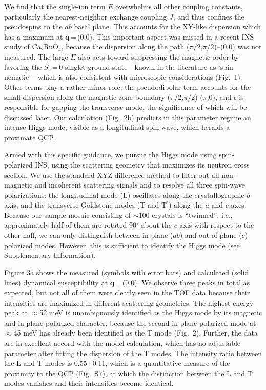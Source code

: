\documentclass[twocolumn,prb,aps,showpacs]{revtex4-1}
\newcommand{\CROns}{Ca$_2$RuO$_4$}
\begin{document}
We find that the single-ion term $E$ %
overwhelms all other coupling constants, particularly the nearest-neighbor exchange coupling $J$, and thus confines the pseudospins to the $ab$ basal plane. This accounts for the XY-like dispersion which has a maximum at $\mathbf{q}$\,=\,(0,0). This important aspect was missed in a recent INS study of \CROns, because the dispersion along the path ($\pi$/2,$\pi$/2)--(0,0) was not measured\cite{Braden_2015}. The large $E$ also acts toward suppressing the magnetic order by favoring the $S_z$\,=\,0 singlet ground state---known in the literature as `spin nematic'\cite{Podolsky2005}---which is also consistent with microscopic considerations (Fig.~1). Other terms play a rather minor role; the pseudodipolar term accounts for the small dispersion along the magnetic zone boundary ($\pi$/2,$\pi$/2)-($\pi$,0), and $\epsilon$ is responsible for gapping the transverse mode, the significance of which will be discussed later.  Our calculation (Fig.~2b) predicts in this parameter regime an intense Higgs mode, visible as a longitudinal spin wave, which heralds a proximate QCP. 

Armed with this specific guidance, we pursue the Higgs mode using spin-polarized INS, using the scattering geometry that maximizes its neutron cross section. We use the standard XYZ-difference method to filter out all non-magnetic and incoherent scattering signals and to resolve all three spin-wave polarizations: the longitudinal mode (L) oscillates along the crystallographic $b$-axis, and the transverse Goldstone modes (T and T$^\prime$) along the $a$ and $c$ axes. Because our sample mosaic consisting of $\sim$100 crystals is ``twinned'', i.e., approximately half of them are rotated 90$^\circ$ about the $c$ axis with respect to the other half, we can only distinguish between in-plane ($ab$) and out-of-plane ($c$) polarized modes. However, this is sufficient to identify the Higgs mode (see Supplementary Information). 


Figure 3a shows the measured (symbols with error bars) and calculated (solid lines) dynamical susceptibility at $\mathbf{q}$\,=\,(0,0). We observe three peaks in total as expected, but not all of them were clearly seen in the TOF data because their intensities are maximized in different scattering geometries. The highest-energy peak at $\approx$52 meV is unambiguously identified as the Higgs mode by its magnetic and in-plane-polarized character, because the second in-plane-polarized mode at $\approx$45 meV has already been identified as the T mode (Fig.~2). Further, the data are in excellent accord with the model calculation, which has no adjustable parameter after fitting the dispersion of the T modes. The intensity ratio between the L and T modes is 0.55$\pm$0.11, which is a quantitative measure of the proximity to the QCP (Fig.~S7), at which the distinction between the L and T modes vanishes and their intensities become identical.  
\end{document}
